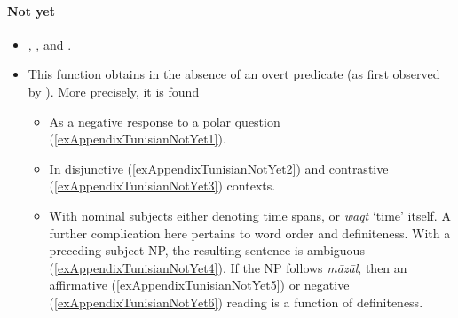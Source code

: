 \paragraph{Not yet}\label{appendixTunisianNotYet}
\begin{itemize}
	\item \textcite{FischerEtAlTunisian}, \textcite[1736]{MarcaisGuiga19581961}, \textcite[203]{RittBenmimoun2014} and \textcite[650–651]{Singer1984}.
	\item This function obtains in the absence of an overt predicate (as first observed by \cite[1740]{MarcaisGuiga19581961}). More precisely, it is found
	\begin{itemize}
		\item As a negative response to a polar question (\ref{exAppendixTunisianNotYet1}).
		\item In disjunctive (\ref{exAppendixTunisianNotYet2}) and contrastive (\ref{exAppendixTunisianNotYet3}) contexts.
		\item With nominal subjects either denoting time spans, or  \textit{waqt} \lq time\rq{ }itself. A further complication here pertains to word order and definiteness. With a preceding subject NP, the resulting sentence is ambiguous (\ref{exAppendixTunisianNotYet4}). If the NP follows \textit{māzāl}, then an affirmative (\ref{exAppendixTunisianNotYet5}) or negative (\ref{exAppendixTunisianNotYet6}) reading is a function of definiteness.
	\end{itemize}
\end{itemize}

